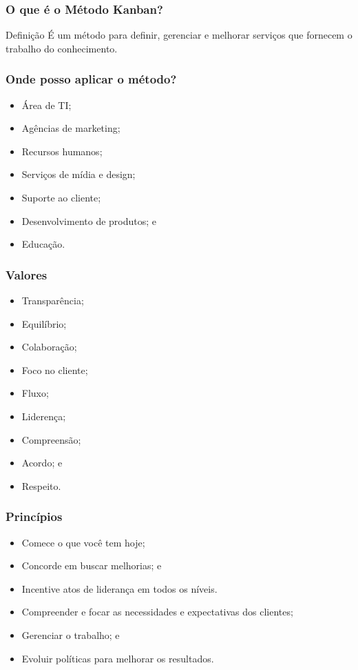 \documentclass[aspectratio=169]{beamer}
\begin{document}
\begin{frame}
	\frametitle{O que é o Método Kanban?}

	\begin{block}{Defini\c cão}
	É um método para definir, gerenciar e melhorar serviços que fornecem o trabalho do conhecimento.
	\end{block}
\end{frame}

\begin{frame}
	\frametitle{Onde posso aplicar o método?}

	\begin{itemize}
		\item Área de TI;
		\item Agências de marketing;
		\item Recursos humanos;
		\item Servi\c cos de mídia e design;
		\item Suporte ao cliente;
		\item Desenvolvimento de produtos; e
		\item Educa\c cão.
	\end{itemize}
\end{frame}

\begin{frame}
	\frametitle{Valores}

	\begin{itemize}
		\item Transparência;
		\item Equilíbrio;
		\item Colabora\c cão;
		\item Foco no cliente;
		\item Fluxo;
		\item Lideren\c ca;
		\item Compreensão;
		\item Acordo; e
		\item Respeito.
	\end{itemize}
\end{frame}

\begin{frame}
	\frametitle{Princípios}

	
	\begin{itemize}
		\item Comece o que você tem hoje;
		\item Concorde em buscar melhorias; e
		\item Incentive atos de liderança em todos os níveis.
	\end{itemize}

	
	\begin{itemize}
		\item Compreender e focar as necessidades e expectativas dos clientes;
		\item Gerenciar o trabalho; e
		\item Evoluir políticas para melhorar os resultados.
	\end{itemize}	
\end{frame}
\end{document}
